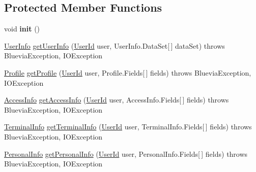 \subsection*{Protected Member Functions}
\begin{DoxyCompactItemize}
\item 
\hypertarget{classcom_1_1bluevia_1_1directory_1_1client_1_1BVDirectoryClient_abc58c3287886b7d70038b8271996e055}{
void {\bfseries init} ()}
\label{classcom_1_1bluevia_1_1directory_1_1client_1_1BVDirectoryClient_abc58c3287886b7d70038b8271996e055}

\item 
\hyperlink{classcom_1_1bluevia_1_1directory_1_1data_1_1UserInfo}{UserInfo} \hyperlink{classcom_1_1bluevia_1_1directory_1_1client_1_1BVDirectoryClient_ade6e58c1a32eef2aa8ee436906ce0088}{getUserInfo} (\hyperlink{classcom_1_1bluevia_1_1commons_1_1data_1_1UserId}{UserId} user, UserInfo.DataSet\mbox{[}$\,$\mbox{]} dataSet)  throws BlueviaException, IOException 
\item 
\hyperlink{classcom_1_1bluevia_1_1directory_1_1data_1_1Profile}{Profile} \hyperlink{classcom_1_1bluevia_1_1directory_1_1client_1_1BVDirectoryClient_a065ca71748fbd119dc7146c0f0cf9829}{getProfile} (\hyperlink{classcom_1_1bluevia_1_1commons_1_1data_1_1UserId}{UserId} user, Profile.Fields\mbox{[}$\,$\mbox{]} fields)  throws BlueviaException, IOException 
\item 
\hyperlink{classcom_1_1bluevia_1_1directory_1_1data_1_1AccessInfo}{AccessInfo} \hyperlink{classcom_1_1bluevia_1_1directory_1_1client_1_1BVDirectoryClient_a4545f012209fb596bb241861088f8711}{getAccessInfo} (\hyperlink{classcom_1_1bluevia_1_1commons_1_1data_1_1UserId}{UserId} user, AccessInfo.Fields\mbox{[}$\,$\mbox{]} fields)  throws BlueviaException, IOException 
\item 
\hyperlink{classcom_1_1bluevia_1_1directory_1_1data_1_1TerminalInfo}{TerminalInfo} \hyperlink{classcom_1_1bluevia_1_1directory_1_1client_1_1BVDirectoryClient_a7ff68bbe5063eeeb40bb9e7adc16b39c}{getTerminalInfo} (\hyperlink{classcom_1_1bluevia_1_1commons_1_1data_1_1UserId}{UserId} user, TerminalInfo.Fields\mbox{[}$\,$\mbox{]} fields)  throws BlueviaException, IOException 
\item 
\hyperlink{classcom_1_1bluevia_1_1directory_1_1data_1_1PersonalInfo}{PersonalInfo} \hyperlink{classcom_1_1bluevia_1_1directory_1_1client_1_1BVDirectoryClient_a3b93ca7c130614d56d9657a4ec28d752}{getPersonalInfo} (\hyperlink{classcom_1_1bluevia_1_1commons_1_1data_1_1UserId}{UserId} user, PersonalInfo.Fields\mbox{[}$\,$\mbox{]} fields)  throws BlueviaException, IOException 
\end{DoxyCompactItemize}


